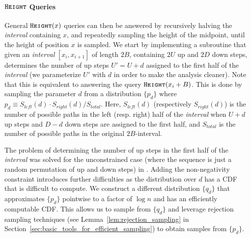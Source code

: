 \paragraph*{$\texttt{\textsc{Height}}$ Queries}
\label{par:height_queries}
General $\texttt{\textsc{Height}}(x)$ queries can then be answered by recursively halving the \emph{interval} containing $x$,
and repeatedly sampling the height of the midpoint, until the height of position $x$ is sampled.
We start by implementing a subroutine that given an \emph{interval} $[x_i,x_{i+1}]$ of length $2B$, containing $2U$ up and $2D$ down steps,
determines the number of up steps $U'=U+d$ assigned to the first half of the \emph{interval}
(we parameterize $U'$ with $d$ in order to make the analysis cleaner).
Note that this is equivalent to answering the query $\texttt{\textsc{Height}}(x_i+B)$.
This is done by sampling the parameter $d$ from a distribution $\{ p_d\}$ where $p_d \equiv S_{left}(d)\cdot S_{right}(d)/S_{total}$.
Here, $S_{left}(d)$ (respectively $S_{right}(d)$) is the number of possible paths in the left (resp. right) half of the \emph{interval} when
$U+d$ up steps and $D-d$ down steps are assigned to the first half, and $S_{total}$ is the number of possible paths in the original $2B$-interval.

The problem of determining the number of up steps in the first half of the \emph{interval} was solved for the unconstrained case
(where the sequence is just a random permutation of up and down steps) in \cite{huge}.
Adding the non-negativity constraint introduces further difficulties as the distribution over $d$ has a CDF that is difficult to compute.
We construct a different distribution $\{q_d\}$ that approximates $\{p_d\}$ pointwise to a factor of $\log n$ and has an efficiently computable CDF.
This allows us to sample from $\{q_d\}$ and leverage rejection sampling techniques
(see Lemma~\ref{lem:rejection_sampling} in Section~\ref{sec:basic_tools_for_efficient_sampling}) to obtain samples from $\{p_d\}$.

